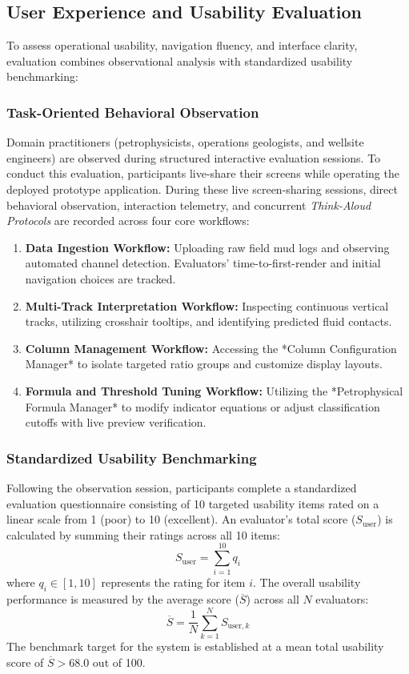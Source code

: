 \subsection{User Experience and Usability Evaluation}

To assess operational usability, navigation fluency, and interface clarity, evaluation combines observational analysis with standardized usability benchmarking:

\subsubsection{Task-Oriented Behavioral Observation}
Domain practitioners (petrophysicists, operations geologists, and wellsite engineers) are observed during structured interactive evaluation sessions. To conduct this evaluation, participants live-share their screens while operating the deployed prototype application. During these live screen-sharing sessions, direct behavioral observation, interaction telemetry, and concurrent \textit{Think-Aloud Protocols} are recorded across four core workflows:
\begin{enumerate}
    \item \textbf{Data Ingestion Workflow:} Uploading raw field mud logs and observing automated channel detection. Evaluators' time-to-first-render and initial navigation choices are tracked.
    \item \textbf{Multi-Track Interpretation Workflow:} Inspecting continuous vertical tracks, utilizing crosshair tooltips, and identifying predicted fluid contacts.
    \item \textbf{Column Management Workflow:} Accessing the *Column Configuration Manager* to isolate targeted ratio groups and customize display layouts.
    \item \textbf{Formula and Threshold Tuning Workflow:} Utilizing the *Petrophysical Formula Manager* to modify indicator equations or adjust classification cutoffs with live preview verification.
\end{enumerate}

\subsubsection{Standardized Usability Benchmarking}
Following the observation session, participants complete a standardized evaluation questionnaire consisting of 10 targeted usability items rated on a linear scale from 1 (poor) to 10 (excellent). An evaluator's total score ($S_{\text{user}}$) is calculated by summing their ratings across all 10 items:
\begin{equation}
    S_{\text{user}} = \sum_{i=1}^{10} q_i
\end{equation}
where $q_i \in [1, 10]$ represents the rating for item $i$. The overall usability performance is measured by the average score ($\overline{S}$) across all $N$ evaluators:
\begin{equation}
    \overline{S} = \frac{1}{N} \sum_{k=1}^{N} S_{\text{user}, k}
\end{equation}
The benchmark target for the system is established at a mean total usability score of $\overline{S} > 68.0$ out of 100.

